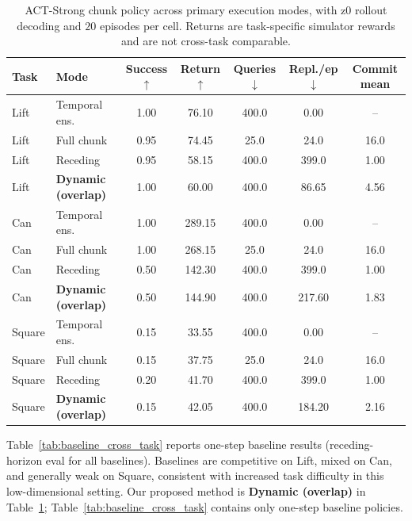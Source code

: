 \documentclass{article}
\begin{document}
\begin{table}[H]
\centering
\small
\begin{tabular}{@{}llccccc@{}}
\toprule
Task & Mode & Success $\uparrow$ & Return $\uparrow$ & Queries $\downarrow$ & Repl./ep $\downarrow$ & Commit mean \\
\midrule
Lift & Temporal ens. & 1.00 & 76.10 & 400.0 & 0.00 & -- \\
Lift & Full chunk & 0.95 & 74.45 & 25.0 & 24.0 & 16.0 \\
Lift & Receding & 0.95 & 58.15 & 400.0 & 399.0 & 1.00 \\
Lift & \textbf{Dynamic (overlap)} & 1.00 & 60.00 & 400.0 & 86.65 & 4.56 \\
\midrule
Can & Temporal ens. & 1.00 & 289.15 & 400.0 & 0.00 & -- \\
Can & Full chunk & 1.00 & 268.15 & 25.0 & 24.0 & 16.0 \\
Can & Receding & 0.50 & 142.30 & 400.0 & 399.0 & 1.00 \\
Can & \textbf{Dynamic (overlap)} & 0.50 & 144.90 & 400.0 & 217.60 & 1.83 \\
\midrule
Square & Temporal ens. & 0.15 & 33.55 & 400.0 & 0.00 & -- \\
Square & Full chunk & 0.15 & 37.75 & 25.0 & 24.0 & 16.0 \\
Square & Receding & 0.20 & 41.70 & 400.0 & 399.0 & 1.00 \\
Square & \textbf{Dynamic (overlap)} & 0.15 & 42.05 & 400.0 & 184.20 & 2.16 \\
\bottomrule
\end{tabular}
\caption{ACT-Strong chunk policy across primary execution modes, with z0 rollout decoding and $20$ episodes per cell. Returns are task-specific simulator rewards and are not cross-task comparable.}
\label{tab:act_main_cross_task}
\end{table}

Table~\ref{tab:baseline_cross_task} reports one-step baseline results (receding-horizon eval for all baselines). Baselines are competitive on Lift, mixed on Can, and generally weak on Square, consistent with increased task difficulty in this low-dimensional setting. Our proposed method is \textbf{Dynamic (overlap)} in Table~\ref{tab:act_main_cross_task}; Table~\ref{tab:baseline_cross_task} contains only one-step baseline policies.
\end{document}
